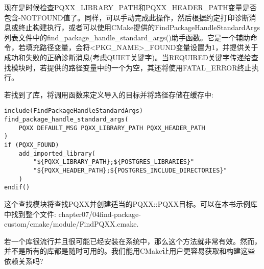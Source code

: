 现在是时候检查PQXX\_LIBRARY\_PATH和PQXX\_HEADER\_PATH变量是否包含-NOTFOUND值了。同样，可以手动完成此操作，然后根据约定打印诊断消息或终止构建执行，或者可以使用CMake提供的FindPackageHandleStandardArgs列表文件中的find\_package\_handle\_standard\_args()助手函数。它是一个辅助命令，若填充路径变量，会将<PKG\_NAME>\_FOUND变量设置为1，并提供关于成功和失败的正确诊断消息(考虑QUIET关键字)。当REQUIRED关键字传递给查找模块时，若提供的路径变量中的一个为空，其还将使用FATAL\_ERROR终止执行。

若找到了库，将调用函数来定义导入的目标并将路径存储在缓存中:

\begin{lstlisting}[style=styleCMake]
include(FindPackageHandleStandardArgs)
find_package_handle_standard_args(
	PQXX DEFAULT_MSG PQXX_LIBRARY_PATH PQXX_HEADER_PATH
)
if (PQXX_FOUND)
	add_imported_library(
		"${PQXX_LIBRARY_PATH};${POSTGRES_LIBRARIES}"
		"${PQXX_HEADER_PATH};${POSTGRES_INCLUDE_DIRECTORIES}"
	)
endif()
\end{lstlisting}

这个查找模块将查找PQXX并创建适当的PQXX::PQXX目标。可以在本书示例库中找到整个文件: chapter07/04find-package-custom/cmake/module/FindPQXX.cmake.

若一个库很流行并且很可能已经安装在系统中，那么这个方法就非常有效。然而，并不是所有的库都是随时可用的。我们能用CMake让用户更容易获取和构建这些依赖关系吗?



























